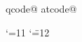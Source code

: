 %
%
%
%
%
%
%

\expandafter\edef\csname qqcode\string @
\expandafter\edef\csname atcode\string @

\catcode`\@=11
\catcode`\"=12

\def\eat@#1{}

\def\hexnumber@#1{\ifcase#10\or 1\or 2\or 3\or 4\or 5\or 6\or 7\or 8\or
 9\or A\or B\or C\or D\or E\or F\fi}

\def\encode#1#2{\count@#2\relax
 \ifnum\count@<\sixt@@n
 \expandafter\edef
  \csname\expandafter\eat@\string#1@HX\endcsname{0\hexnumber@\count@}%
 \else
  {\count\z@\count@\divide\count\z@\sixt@@n
  \edef\next@{\hexnumber@{\count\z@}}%
  \multiply\count\z@\sixt@@n\advance\count@-\count\z@
  \expandafter\xdef
   \csname\expandafter\eat@\string#1@HX\endcsname{\next@\hexnumber@\count@}}%
  \fi}





